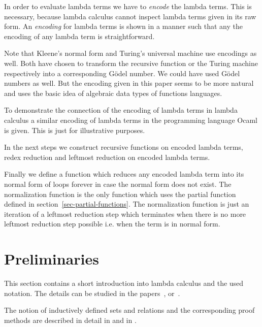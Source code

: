 \documentclass[12pt]{article}
\begin{document}
In order to evaluate lambda terms we have to \emph{encode} the lambda terms.
This is necessary, because lambda calculus cannot inspect lambda terms given in
its raw form. An \emph{encoding} for lambda terms is shown in a manner such that
any the encoding of any lambda term is straightforward.

Note that Kleene's normal form and Turing's universal machine use encodings as
well. Both have chosen to transform the recursive function or the Turing machine
respectively into a corresponding Gödel number. We could have used Gödel numbers
as well. But the encoding given in this paper seems to be more natural and uses
the basic idea of algebraic data types of functions languages.

To demonstrate the connection of the encoding of lambda terms in lambda calculus
a similar encoding of lambda terms in the programming language Ocaml is given.
This is just for illustrative purposes.

In the next steps we construct recursive functions on encoded lambda terms,
redex reduction and leftmost reduction on encoded lambda terms.

Finally we define a function which reduces any encoded lambda term into its
normal form of loops forever in case the normal form does not exist. The
normalization function is the only function which uses the partial function
defined in section~\ref{sec-partial-functions}. The normalization function is
just an iteration of a leftmost reduction step which terminates when there is no
more leftmost reduction step possible i.e. when the term is in normal form.










\section{Preliminaries}
\label{sec-preliminaries}

This section contains a short introduction into lambda calculus and the used
notation. The details can be studied in the
papers~\cite{brandl-lambda-step-by-step}, \cite{brandl-lambda-programming}
or~\cite{Barendregt84}.

The notion of inductively defined sets and relations and the corresponding proof
methods are described in detail in \cite{brandl-lambda-step-by-step} and in
\cite{brandl-calculus-of-constructions}.
\end{document}
